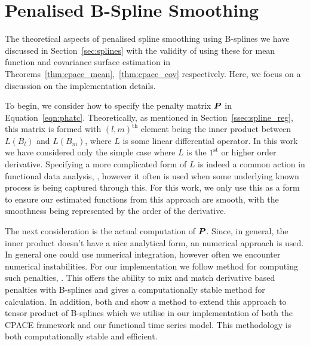 \section{Penalised B-Spline Smoothing \label{sec:psplines}}
The theoretical aspects of penalised spline smoothing using B-splines we have discussed in Section~\ref{sec:splines} with the validity of using these for mean function and covariance surface estimation in Theorems~\ref{thm:cpace_mean},~\ref{thm:cpace_cov} respectively.
Here, we focus on a discussion on the implementation details.

To begin, we consider how to specify the penalty matrix $\bm{{P}}$ in Equation~\ref{eqn:phatc}.
Theoretically, as mentioned in Section~\ref{ssec:spline_reg}, this matrix is formed with $\left(l, m\right)^\text{th}$ element being the inner product between $L\left(B_l \right)$ and $L\left(B_m\right)$, where $L$ is some linear differential operator.
In this work we have considered only the simple case where $L$ is the $1^\text{st}$ or higher order derivative.
Specifying a more complicated form of $L$ is indeed a common action in functional data analysis, \citep{ramsay_functional_2010}, however it often is used when some underlying known process is being captured through this.
For this work, we only use this as a form to ensure our estimated functions from this approach are smooth, with the smoothness being represented by the order of the derivative. 

The next consideration is the actual computation of $\bm{{P}}$. 
Since, in general, the inner product doesn't have a nice analytical form, an numerical approach is used.
In general one could use numerical integration, however often we encounter numerical instabilities.
For our implementation we follow \citeauthor{wood_p-splines_2017} method for computing such penalties, \citep{wood_p-splines_2017}.
This offers the ability to mix and match derivative based penalties with B-splines and \citep{wood_p-splines_2017} gives a computationally stable method for calculation.
In addition, both \citep{wood_p-splines_2017} and \citep{wood_low-rank_2006} show a method to extend this approach to tensor product of B-splines which we utilise in our implementation of both the CPACE framework and our functional time series model.
This methodology is both computationally stable and efficient.

